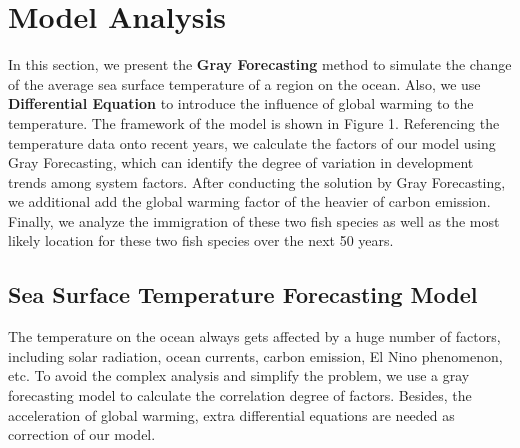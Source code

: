 \documentclass{mcmthesis}
\begin{document}
\section{Model Analysis} \label{S4}
		In this section, we present the \textbf{Gray Forecasting} method to simulate the change of the average sea surface temperature of a region on the ocean. Also, we use \textbf{Differential Equation} to introduce the influence of global warming to the temperature. The framework of the model is shown in Figure 1. Referencing the temperature data onto recent years, we calculate the factors of our model using Gray Forecasting, which can identify the degree of variation in development trends among system factors. After conducting the solution by Gray Forecasting, we additional add the global warming factor of the heavier of carbon emission. Finally, we analyze the immigration of these two fish species as well as the most likely location for these two fish species over the next 50 years.

\subsection{Sea Surface Temperature Forecasting Model}\label{S4s1}
	The temperature on the ocean always gets affected by a huge number of factors, including solar radiation, ocean currents, carbon emission, El Nino phenomenon, etc. To avoid the complex analysis and simplify the problem, we use a gray forecasting model to calculate the correlation degree of factors. Besides, the acceleration of global warming, extra differential equations are needed as correction of our model.
\end{document}
